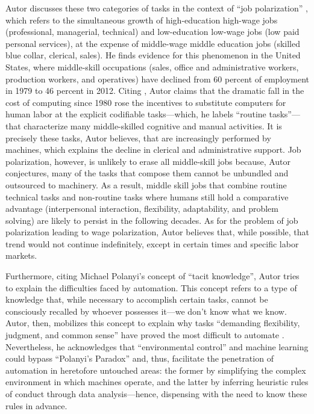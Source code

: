 \documentclass[version=last,draft=false,paper=A4,portrait,twoside=true,twocolumn=false,headinclude=false,footinclude=false,fontsize=12,BCOR=20mm,DIV=calc,pagesize=auto,titlepage=firstiscover,mpinclude=false,open=right,chapterprefix=true,numbers=autoendperiod,headsepline=false,headings=twolinechapter,parskip=false]{scrbook}
\begin{document}
Autor discusses these two categories of tasks in the context of ``job
polarization'' \autocite{goos_manning2003}, which refers to the simultaneous
growth of high-education high-wage jobs (professional, managerial,
technical) and low-education low-wage jobs (low paid personal services), at
the expense of middle-wage middle education jobs (skilled blue collar,
clerical, sales). He finds evidence for this phenomenon in the United
States, where middle-skill occupations (sales, office and administrative
workers, production workers, and operatives) have declined from 60 percent
of employment in 1979 to 46 percent in 2012. Citing \textcite{nordhaus2007},
Autor claims that the dramatic fall in the cost of computing since 1980
rose the incentives to substitute computers for human labor at the explicit
codifiable tasks---which, he labels ``routine tasks''---that characterize
many middle-skilled cognitive and manual activities. It is precisely these
tasks, Autor believes, that are increasingly performed by machines, which
explains the decline in clerical and administrative support. Job
polarization, however, is unlikely to erase all middle-skill jobs because,
Autor conjectures, many of the tasks that compose them cannot be unbundled
and outsourced to machinery. As a result, middle skill jobs that combine
routine technical tasks and non-routine tasks where humans still hold a
comparative advantage (interpersonal interaction, flexibility,
adaptability, and problem solving) are likely to persist in the following
decades. As for the problem of job polarization leading to wage
polarization, Autor believes that, while possible, that trend would not
continue indefinitely, except in certain times and specific labor markets.

Furthermore, citing Michael Polanyi's concept of ``tacit knowledge'', Autor
tries to explain the difficulties faced by automation. This concept refers
to a type of knowledge that, while necessary to accomplish certain tasks,
cannot be consciously recalled by whoever possesses it---we don't know what
we know. Autor, then, mobilizes this concept to explain why tasks
``demanding flexibility, judgment, and common sense'' have proved the most
difficult to automate \autocite[11]{autor2015}. Nevertheless, he
acknowledges that ``environmental control'' and machine learning could
bypass ``Polanyi's Paradox'' and, thus, facilitate the penetration of
automation in heretofore untouched areas: the former by simplifying the
complex environment in which machines operate, and the latter by inferring
heuristic rules of conduct through data analysis---hence, dispensing with
the need to know these rules in advance.
\end{document}
